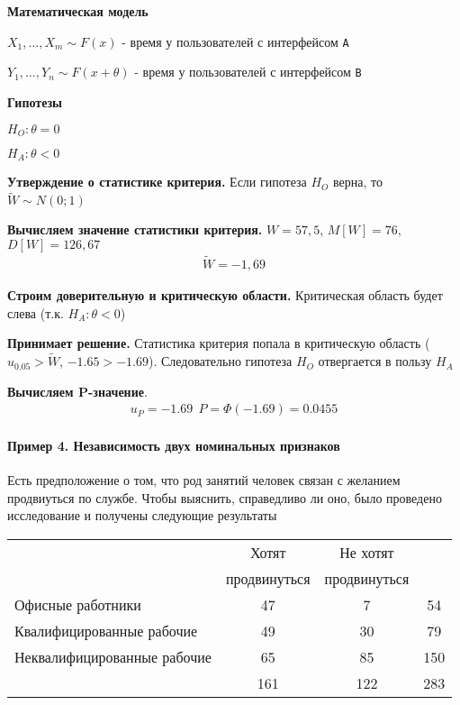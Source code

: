 \documentclass[12pt]{extarticle}
\begin{document}
\par\textbf{Математическая модель}
\begin{description}
    \item $X_{1},\ldots,X_{m}\sim F(x)$ - время у пользователей с
        интерфейсом \verb|A|
    \item $Y_{1},\ldots,Y_{n}\sim F(x+\theta)$ - время у пользователей с
        интерфейсом \verb|B|
\end{description}

\par\textbf{Гипотезы}
\begin{description}
    \item $H_{O}:\theta=0$
    \item $H_{A}:\theta<0$
\end{description}

\par\textbf{Утверждение о статистике критерия.} Если гипотеза $H_{O}$
верна, то $\widetilde{W}\sim N(0;1)$

\par\textbf{Вычисляем значение статистики критерия.} $W=57,5$,
$M[W]=76$, $D[W]=126,67$
\begin{eqnarray*}
    \widetilde{W}=-1,69
\end{eqnarray*}

\par\textbf{Строим доверительную и критическую области.} Критическая
область будет слева (т.к. $H_{A}:\theta < 0$)

\par\textbf{Принимает решение.} Статистика критерия попала в критическую
область ($u_{0.05}>\widetilde{W}$, $-1.65>-1.69$). Следовательно
гипотеза $H_{O}$ отвергается в пользу $H_{A}$

\par\textbf{Вычисляем P-значение}.
\begin{eqnarray*}
    u_{P}=-1.69
    \ \ P=\Phi(-1.69)=0.0455
\end{eqnarray*}

\paragraph{Пример 4. Независимость двух номинальных признаков}
Есть предположение о том, что род занятий человек связан с желанием
продвиуться по службе. Чтобы выяснить, справедливо ли оно, было
проведено исследование и получены следующие результаты
\begin{center}\begin{tabular}{l|c|c|c}
    & Хотят & Не хотят & \\
    & продвинуться & продвинуться & \\\hline
    Офисные работники & 47 & 7 & 54 \\\hline
    Квалифицированные рабочие & 49 & 30 & 79 \\\hline
    Неквалифицированные рабочие & 65 & 85 & 150 \\\hline
                                & 161 & 122 & 283
\end{tabular}
\end{center}
\end{document}
